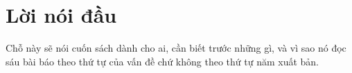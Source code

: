 \chapter{Lời nói đầu}
\label{ch:loi-noi-dau}


Chỗ này sẽ nói cuốn sách dành cho ai, cần biết trước những gì, và vì sao nó đọc
sáu bài báo theo thứ tự của vấn đề chứ không theo thứ tự năm xuất bản.
